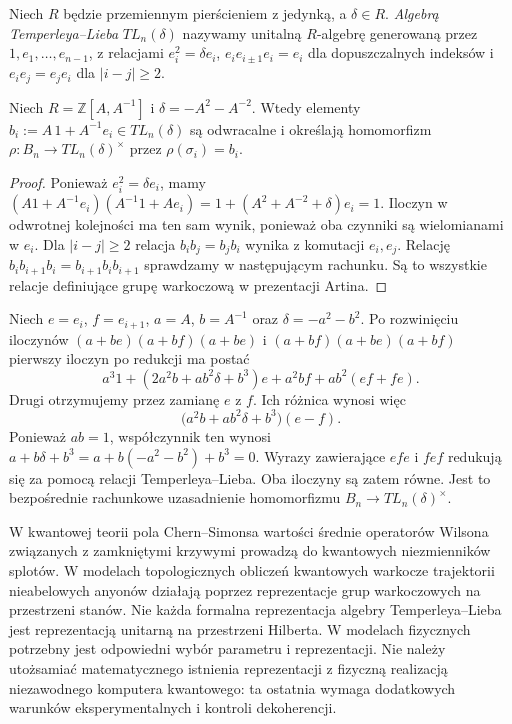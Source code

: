 \begin{definicja}
Niech $R$ będzie przemiennym pierścieniem z jedynką,
a $\delta\in R$. \emph{Algebrą Temperleya--Lieba}
$TL_n(\delta)$ nazywamy unitalną $R$-algebrę generowaną
przez $1,e_1,\dots,e_{n-1}$, z relacjami
$e_i^2=\delta e_i$,
$e_ie_{i\pm1}e_i=e_i$ dla dopuszczalnych indeksów
i $e_ie_j=e_je_i$ dla $|i-j|\geq2$.
\end{definicja}

\begin{stwierdzenie}
Niech $R=\mathbb Z[A,A^{-1}]$ i $\delta=-A^2-A^{-2}$.
Wtedy elementy $b_i:=A\,1+A^{-1}e_i\in TL_n(\delta)$
są odwracalne i określają homomorfizm
$\rho\colon B_n\to TL_n(\delta)^\times$ przez
$\rho(\sigma_i)=b_i$.
\end{stwierdzenie}

\begin{proof}
Ponieważ $e_i^2=\delta e_i$, mamy
$(A1+A^{-1}e_i)(A^{-1}1+Ae_i)
=1+(A^2+A^{-2}+\delta)e_i=1$.
Iloczyn w odwrotnej kolejności ma ten sam wynik,
ponieważ oba czynniki są wielomianami w $e_i$.
Dla $|i-j|\ge2$ relacja $b_ib_j=b_jb_i$
wynika z komutacji $e_i,e_j$.
Relację $b_ib_{i+1}b_i=b_{i+1}b_ib_{i+1}$
sprawdzamy w następującym rachunku.
Są to wszystkie relacje definiujące grupę
warkoczową w prezentacji Artina.
\end{proof}

\begin{przyklad}
Niech $e=e_i$, $f=e_{i+1}$, $a=A$, $b=A^{-1}$ oraz
$\delta=-a^2-b^2$. Po rozwinięciu iloczynów
$(a+be)(a+bf)(a+be)$ i $(a+bf)(a+be)(a+bf)$
pierwszy iloczyn po redukcji ma postać
\[
a^3 1+(2a^2b+ab^2\delta+b^3)e
+a^2bf+ab^2(ef+fe).
\]
Drugi otrzymujemy przez zamianę $e$ z $f$.
Ich różnica wynosi więc
\[
\bigl(a^2b+ab^2\delta+b^3\bigr)(e-f).
\]
Ponieważ $ab=1$, współczynnik ten wynosi
$a+b\delta+b^3=a+b(-a^2-b^2)+b^3=0$.
Wyrazy zawierające $efe$ i $fef$ redukują się za pomocą
relacji Temperleya--Lieba. Oba iloczyny są zatem równe.
Jest to bezpośrednie rachunkowe uzasadnienie homomorfizmu
$B_n\to TL_n(\delta)^\times$.
\end{przyklad}

\begin{uwaga}
W kwantowej teorii pola Chern--Simonsa wartości średnie
operatorów Wilsona związanych z zamkniętymi krzywymi
prowadzą do kwantowych niezmienników splotów. W modelach
topologicznych obliczeń kwantowych warkocze trajektorii
nieabelowych anyonów działają poprzez reprezentacje
grup warkoczowych na przestrzeni stanów.
Nie każda formalna reprezentacja algebry
Temperleya--Lieba jest reprezentacją unitarną
na przestrzeni Hilberta. W modelach fizycznych
potrzebny jest odpowiedni wybór parametru
i reprezentacji. Nie należy utożsamiać matematycznego
istnienia reprezentacji z fizyczną realizacją
niezawodnego komputera kwantowego: ta ostatnia wymaga dodatkowych
warunków eksperymentalnych i kontroli dekoherencji.
\end{uwaga}

